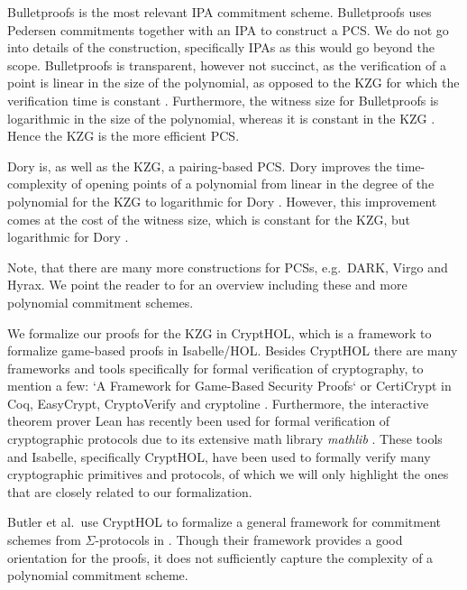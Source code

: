 Bulletproofs \parencite{Bulletproofs} is the most relevant IPA commitment scheme. 
Bulletproofs uses Pedersen commitments\parencite{Pedersen_Commitments} together with an IPA to construct a PCS. We do not go into details of the construction, specifically IPAs as this would go beyond the scope. Bulletproofs is transparent, however not succinct, as the verification of a point is linear in the size of the polynomial, as opposed to the KZG for which the verification time is constant \parencite{Bulletproofs,KZG}. Furthermore, the witness size for Bulletproofs is logarithmic in the size of the polynomial, whereas it is constant in the KZG \parencite{Bulletproofs,KZG}. Hence the KZG is the more efficient PCS. 

Dory\parencite{Dory} is, as well as the KZG, a pairing-based PCS. Dory improves the time-complexity of opening points of a polynomial from linear in the degree of the polynomial for the KZG to logarithmic for Dory \parencite{Dory}. However, this improvement comes at the cost of the witness size, which is constant for the KZG, but logarithmic for Dory \parencite{Dory}. 

Note, that there are many more constructions for PCSs, e.g.\ DARK\parencite*{DARK}, Virgo \parencite*{Virgo} and Hyrax\parencite*{Hyrax}. We point the reader to \parencite*{Dory} for an overview including these and more polynomial commitment schemes.

We formalize our proofs for the KZG in CryptHOL\parencite{CryptHOL-AFP}, which is a framework to formalize game-based proofs in Isabelle/HOL.
Besides CryptHOL there are many frameworks and tools specifically for formal verification of cryptography, to mention a few: `A Framework for Game-Based Security Proofs` \parencite{game_based_coq} or CertiCrypt \parencite{crypto_coq} in Coq\parencite{Coq}, EasyCrypt\parencite{EasyCrypt}, CryptoVerify\parencite{CryptoVerif} and cryptoline \parencite{Cryptoline}. Furthermore, the interactive theorem prover Lean\parencite{Lean} has recently been used for formal verification of cryptographic protocols due to its extensive math library \textit{mathlib} \parencite{Lean_groth16}.
These tools and Isabelle, specifically CryptHOL, have been used to formally verify many cryptographic primitives and protocols, of which we will only highlight the ones that are closely related to our formalization.

Butler et al.\ use CryptHOL to formalize a general framework for commitment schemes from $\Sigma$-protocols in \parencite{sigma_commit_crypto}. Though their framework provides a good orientation for the proofs, it does not sufficiently capture the complexity of a polynomial commitment scheme.

